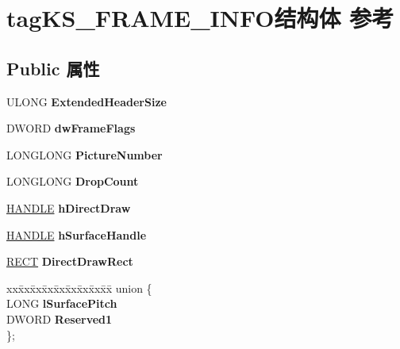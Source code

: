 \hypertarget{structtag_k_s___f_r_a_m_e___i_n_f_o}{}\section{tag\+K\+S\+\_\+\+F\+R\+A\+M\+E\+\_\+\+I\+N\+F\+O结构体 参考}
\label{structtag_k_s___f_r_a_m_e___i_n_f_o}
\subsection*{Public 属性}
\begin{DoxyCompactItemize}
\item 
\mbox{\label{structtag_k_s___f_r_a_m_e___i_n_f_o_afa44189766ee54a822f030e6cc5f41e0}} 
U\+L\+O\+NG {\bfseries Extended\+Header\+Size}
\item 
\mbox{\label{structtag_k_s___f_r_a_m_e___i_n_f_o_a3a50f52d2afdc4d186ac54d875b7fbaf}} 
D\+W\+O\+RD {\bfseries dw\+Frame\+Flags}
\item 
\mbox{\label{structtag_k_s___f_r_a_m_e___i_n_f_o_aae3fb36ed8f84f35b82e548d1a5375ca}} 
L\+O\+N\+G\+L\+O\+NG {\bfseries Picture\+Number}
\item 
\mbox{\label{structtag_k_s___f_r_a_m_e___i_n_f_o_af4b5f5aeaf4b623fb87766d9b5f19a41}} 
L\+O\+N\+G\+L\+O\+NG {\bfseries Drop\+Count}
\item 
\mbox{\label{structtag_k_s___f_r_a_m_e___i_n_f_o_ab534f79a08a2c4929a92e267b4045639}} 
\hyperlink{interfacevoid}{H\+A\+N\+D\+LE} {\bfseries h\+Direct\+Draw}
\item 
\mbox{\label{structtag_k_s___f_r_a_m_e___i_n_f_o_a1875e5986c03a09d88eb89a13db527c3}} 
\hyperlink{interfacevoid}{H\+A\+N\+D\+LE} {\bfseries h\+Surface\+Handle}
\item 
\mbox{\label{structtag_k_s___f_r_a_m_e___i_n_f_o_a5976a9d3e80575e90690c7d5a7050759}} 
\hyperlink{structtag_r_e_c_t}{R\+E\+CT} {\bfseries Direct\+Draw\+Rect}
\item 
\mbox{\label{structtag_k_s___f_r_a_m_e___i_n_f_o_adc91164ee134d711831bdc71298099c1}} 
\begin{tabbing}
xx\=xx\=xx\=xx\=xx\=xx\=xx\=xx\=xx\=\kill
union \{\\
\>LONG {\bfseries lSurfacePitch}\\
\>DWORD {\bfseries Reserved1}\\
\}; \\


\end{tabbing}
\end{DoxyCompactItemize}
